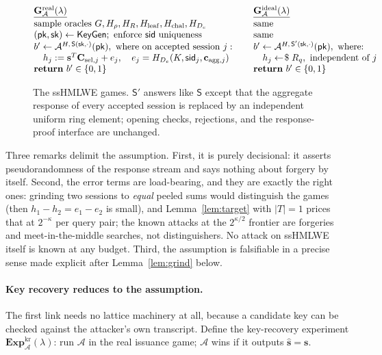 \documentclass[11pt]{article}
\newcommand{\R}{R_q}
\newcommand{\sample}{\mathrel{\leftarrow\joinrel\$}}
\newcommand{\Exp}{\mathbf{Exp}}
\newcommand{\Gm}{\mathbf{G}}
\renewcommand{\S}{\mathsf{S}}
\begin{document}
\begin{figure}[H]
\[
\begin{array}{@{}l@{\hspace{8mm}}l@{}}
\underline{\Gm^{\mathrm{real}}_{\mathcal A}(\lambda)} &
\underline{\Gm^{\mathrm{ideal}}_{\mathcal A}(\lambda)} \\[2pt]
\text{sample oracles }G,H_\rho,H_R,H_{\mathrm{leaf}},H_{\mathrm{chal}},
 H_{D_e} & \text{same} \\
(\mathsf{pk},\mathsf{sk})\leftarrow\mathsf{KeyGen};\ \text{enforce }
 \mathsf{sid}\text{ uniqueness} & \text{same} \\
b'\leftarrow\mathcal A^{H,\,\S(\mathsf{sk},\cdot)}(\mathsf{pk}),
 \text{ where on accepted session } j:
 & b'\leftarrow\mathcal A^{H,\,\S'(\mathsf{sk},\cdot)}(\mathsf{pk}),
 \text{ where:} \\
\quad h_j:=\mathbf s^{T}\mathbf C_{\mathrm{sel},j}+e_j,\quad
 e_j=H_{D_e}(K,\mathsf{sid}_j,\mathbf c_{\mathrm{agg},j})
 & \quad h_j\sample\R,\ \text{independent of }j\\
\mathbf{return}\ b'\in\{0,1\} & \mathbf{return}\ b'\in\{0,1\}
\end{array}
\]
\caption{The ssHMLWE games.  $\S'$ answers like $\S$ except that the
aggregate response of every accepted session is replaced by an independent
uniform ring element; opening checks, rejections, and the response-proof
interface are unchanged.}
\label{game:sshmlwe}
\end{figure}

Three remarks delimit the assumption.  First, it is purely decisional: it
asserts pseudorandomness of the response stream and says nothing about
forgery by itself.  Second, the error terms are load-bearing, and they are
exactly the right ones: grinding two sessions to \emph{equal} peeled sums
would distinguish the games (then $h_1-h_2=e_1-e_2$ is small), and
Lemma~\ref{lem:target} with $|T|=1$ prices that at $2^{-\kappa}$ per query
pair; the known attacks at the $2^{\kappa/2}$ frontier are forgeries and
meet-in-the-middle searches, not distinguishers.  No attack on ssHMLWE
itself is known at any budget.  Third, the assumption is falsifiable in a
precise sense made explicit after Lemma~\ref{lem:grind} below.

\paragraph{Key recovery reduces to the assumption.}
The first link needs no lattice machinery at all, because a candidate key
can be checked against the attacker's own transcript.  Define the
key-recovery experiment $\Exp^{\mathrm{kr}}_{\mathcal A}(\lambda)$: run
$\mathcal A$ in the real issuance game; $\mathcal A$ wins if it outputs
$\hat{\mathbf s}=\mathbf s$.
\end{document}
